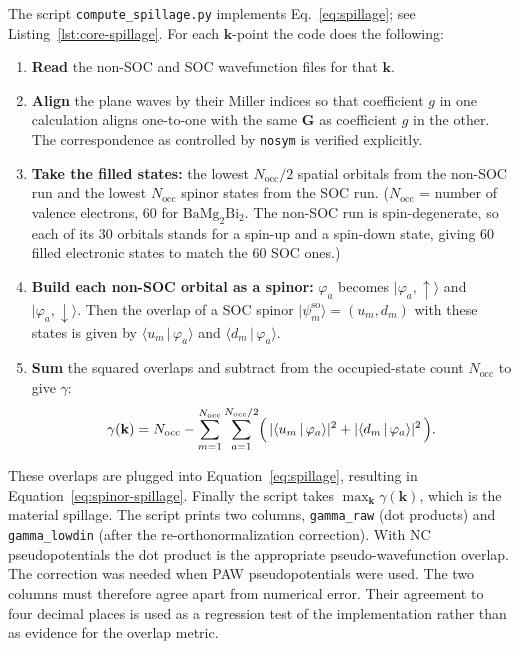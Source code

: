 \documentclass[11pt]{article}
\newcommand{\ket}[1]{\lvert #1 \rangle}
\newcommand{\braket}[2]{\langle #1 \,\vert\, #2 \rangle}
\newcommand{\Nocc}{N_{\mathrm{occ}}}
\newcommand{\kk}{\mathbf{k}}
\newcommand{\GG}{\mathbf{G}}
\newcommand{\bmb}{\mathrm{BaMg_2Bi_2}}
\begin{document}
The script \texttt{compute\_spillage.py} implements Eq.~\eqref{eq:spillage}; see
Listing~\ref{lst:core-spillage}. For each $\kk$-point the code does the following:

\begin{enumerate}[leftmargin=1.6em,itemsep=2pt]
\item \textbf{Read} the non-SOC and SOC wavefunction files for that $\kk$.
\item \textbf{Align} the plane waves by their Miller indices so that coefficient $g$ in one
calculation aligns one-to-one with the same $\GG$ as coefficient $g$ in the other. The correspondence
as controlled by \texttt{nosym} is verified explicitly.
\item \textbf{Take the filled states:} the lowest $\Nocc/2$ spatial orbitals from the non-SOC run and
the lowest $\Nocc$ spinor states from the SOC run. ($\Nocc$ = number of valence electrons, $60$ for
$\bmb$. The non-SOC run is spin-degenerate, so each of its $30$ orbitals stands for a spin-up and a
spin-down state, giving $60$ filled electronic states to match the $60$ SOC ones.)
\item \textbf{Build each non-SOC orbital as a spinor:} $\varphi_a$ becomes $\ket{\varphi_a,\uparrow}$
and $\ket{\varphi_a,\downarrow}$. Then the overlap of a SOC spinor $\ket{\psi^{\text{so}}_m}=
(u_m,d_m)$ with these states is given by $\braket{u_m}{\varphi_a}$ and
$\braket{d_m}{\varphi_a}$.
\item \textbf{Sum} the squared overlaps and subtract from the occupied-state count $\Nocc$ to give
$\gamma$:
\begin{equation}
  \gamma(\kk)=\Nocc-\sum_{m=1}^{\Nocc}\sum_{a=1}^{\Nocc/2}
  \Bigl(\,|\braket{u_m}{\varphi_a}|^2+|\braket{d_m}{\varphi_a}|^2\,\Bigr).
  \label{eq:spinor-spillage}
\end{equation}
\end{enumerate}
These overlaps are plugged into Equation~\eqref{eq:spillage}, resulting in
Equation~\eqref{eq:spinor-spillage}. Finally the script takes $\max_{\kk}\gamma(\kk)$, which is the
material spillage. The script prints two columns, \texttt{gamma\_raw} (dot products) and
\texttt{gamma\_lowdin} (after the re-orthonormalization correction). With NC pseudopotentials the dot
product is the appropriate pseudo-wavefunction overlap. The correction was needed when PAW
pseudopotentials were used.
The two columns must therefore agree apart from numerical error. Their agreement to four decimal
places is used as a regression test of the implementation rather than as evidence for the overlap
metric.
\end{document}
